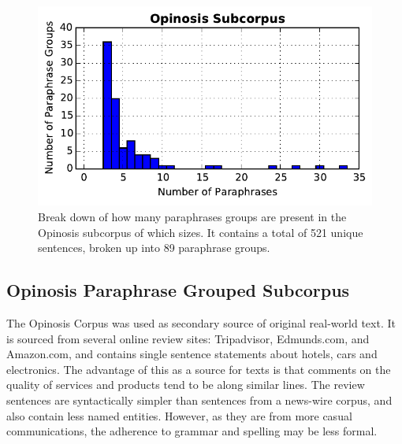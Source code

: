 \documentclass[]{book}
\begin{document}
\begin{figure}[t]
\includegraphics[width=1\columnwidth]{figs/opinosis_hist}

\caption{\label{fig:opinosis_corpus_hist} Break down of how many paraphrases
groups are present in the Opinosis subcorpus of which sizes. It contains
a total of 521 unique sentences, broken up into 89 paraphrase groups.}
\end{figure}



\subsection{Opinosis Paraphrase Grouped Subcorpus}

The Opinosis Corpus \citep{ganesan2010opinosis} was used as secondary
source of original real-world text. It is sourced from several online
review sites: Tripadvisor, Edmunds.com, and Amazon.com, and contains
single sentence statements about hotels, cars and electronics. The
advantage of this as a source for texts is that comments on the quality
of services and products tend to be along similar lines. The review
sentences are syntactically simpler than sentences from a news-wire
corpus, and also contain less named entities. However, as they are
from more casual communications, the adherence to grammar and spelling
may be less formal. 
\end{document}
